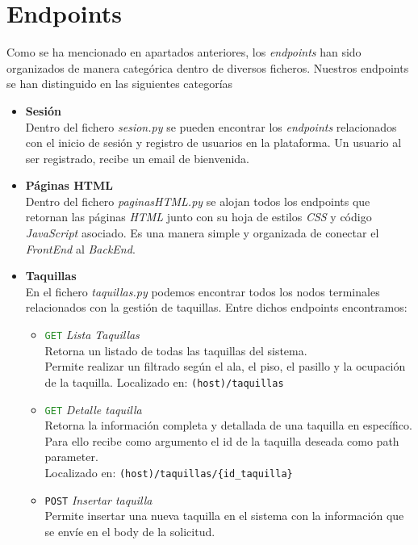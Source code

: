 \documentclass[12pt]{report}
\begin{document}
\section{Endpoints}
Como se ha mencionado en apartados anteriores, los \textit{endpoints} han sido organizados de manera categórica dentro de diversos ficheros. Nuestros endpoints se han distinguido en las siguientes categorías
\begin{itemize}
    \item \textbf{Sesión}\\
    Dentro del fichero \textit{sesion.py} se pueden encontrar los \textit{endpoints} relacionados con el inicio de sesión y registro de usuarios en la plataforma. Un usuario al ser registrado, recibe un email de bienvenida.
    \item \textbf{Páginas HTML}\\
    Dentro del fichero \textit{paginasHTML.py} se alojan todos los endpoints que retornan las páginas \textit{HTML} junto con su hoja de estilos \textit{CSS} y código \textit{JavaScript} asociado. Es una manera simple y organizada de conectar el \textit{FrontEnd} al \textit{BackEnd}.
    \item \textbf{Taquillas}\\
    En el fichero \textit{taquillas.py} podemos encontrar todos los nodos terminales relacionados con la gestión de taquillas.
    Entre dichos endpoints encontramos:
    \begin{itemize}
        \item \textcolor{ForestGreen}{\texttt{GET}} \textit{Lista Taquillas}\\
        Retorna un listado de todas las taquillas del sistema.\\
        Permite realizar un filtrado según el ala, el piso, el pasillo y la ocupación de la taquilla.
        Localizado en: \texttt{(host)/taquillas}
        \item \textcolor{ForestGreen}{\texttt{GET}} \textit{Detalle taquilla}\\
        Retorna la información completa y detallada de una taquilla en específico.\\
        Para ello recibe como argumento el id de la taquilla deseada como path parameter.\\
        Localizado en: \texttt{(host)/taquillas/\{id\_taquilla\}}
        \item \textcolor{YellowOrange}{\texttt{POST}} \textit{Insertar taquilla}\\
        Permite insertar una nueva taquilla en el sistema con la información que se envíe en el body de la solicitud.

\end{itemize}
\end{itemize}
\end{document}

